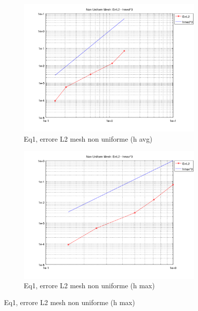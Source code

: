\documentclass[12pt,a4paper]{report}
\theoremstyle{theorem}
\theoremstyle{theorem}
\theoremstyle{definition}
\begin{document}
\begin{figure}[!h]
	\centering
	\begin{subfigure}[b]{0.49\textwidth}
    		\includegraphics[width=\textwidth]{Eq1-L2avg.png}
    		\caption{Eq1, errore L2 mesh non uniforme (h avg)}
    	\end{subfigure}
    	\begin{subfigure}[b]{0.49\textwidth}
    		\includegraphics[width=\textwidth]{Eq1-L2max.png}
    		\caption{Eq1, errore L2 mesh non uniforme (h max)}
    	\end{subfigure}
\end{figure}

\clearpage
\end{document}
